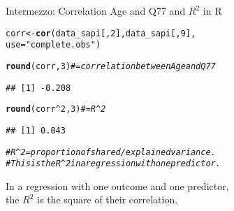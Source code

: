 \documentclass[10pt]{beamer}\usepackage[]{graphicx}\usepackage[]{xcolor}
\makeatletter
\newcommand{\hlnum}[1]{\textcolor[rgb]{0.686,0.059,0.569}{#1}}%
\newcommand{\hlsng}[1]{\textcolor[rgb]{0.192,0.494,0.8}{#1}}%
\newcommand{\hlcom}[1]{\textcolor[rgb]{0.678,0.584,0.686}{\textit{#1}}}%
\newcommand{\hlopt}[1]{\textcolor[rgb]{0,0,0}{#1}}%
\newcommand{\hldef}[1]{\textcolor[rgb]{0.345,0.345,0.345}{#1}}%
\newcommand{\hlkwb}[1]{\textcolor[rgb]{0.69,0.353,0.396}{#1}}%
\newcommand{\hlkwc}[1]{\textcolor[rgb]{0.333,0.667,0.333}{#1}}%
\newcommand{\hlkwd}[1]{\textcolor[rgb]{0.737,0.353,0.396}{\textbf{#1}}}%
\newenvironment{kframe}{%
 \def\at@end@of@kframe{}%
 \ifinner\ifhmode%
  \def\at@end@of@kframe{\end{minipage}}%
  \begin{minipage}{\columnwidth}%
 \fi\fi%
 \def\FrameCommand##1{\hskip\@totalleftmargin \hskip-\fboxsep
 \colorbox{shadecolor}{##1}\hskip-\fboxsep
     \hskip-\linewidth \hskip-\@totalleftmargin \hskip\columnwidth}%
 \MakeFramed {\advance\hsize-\width
   \@totalleftmargin\z@ \linewidth\hsize
   \@setminipage}}%
 {\par\unskip\endMakeFramed%
 \at@end@of@kframe}
\newenvironment{knitrout}{}{} %
\makeatother
\begin{document}
%
\begin{frame}[fragile]{Intermezzo: Correlation Age and Q77 and $R^2$ in R}
\begin{knitrout}
\color{fgcolor}\begin{kframe}
\begin{alltt}
\hldef{corr} \hlkwb{<-} \hlkwd{cor}\hldef{(data_sapi[,} \hlnum{2}\hldef{], data_sapi[,} \hlnum{9}\hldef{],}
          \hlkwc{use} \hldef{=} \hlsng{"complete.obs"}\hldef{)}

\hlkwd{round}\hldef{(corr,} \hlnum{3}\hldef{)}   \hlcom{# = correlation between Age and Q77}
\end{alltt}
\begin{verbatim}
## [1] -0.208
\end{verbatim}
\end{kframe}
\end{knitrout}

\begin{knitrout}
\color{fgcolor}\begin{kframe}
\begin{alltt}
\hlkwd{round}\hldef{(corr}\hlopt{^}\hlnum{2}\hldef{,} \hlnum{3}\hldef{)} \hlcom{# = R^2}
\end{alltt}
\begin{verbatim}
## [1] 0.043
\end{verbatim}
\begin{alltt}
\hlcom{# R^2 = proportion of shared/explained variance. }
\hlcom{# This is the R^2 in a regression with one predictor.}
\end{alltt}
\end{kframe}
\end{knitrout}
In a regression with one outcome and one predictor,\\
the $R^2$ is the square of their correlation.
\end{frame}
%
\end{document}
